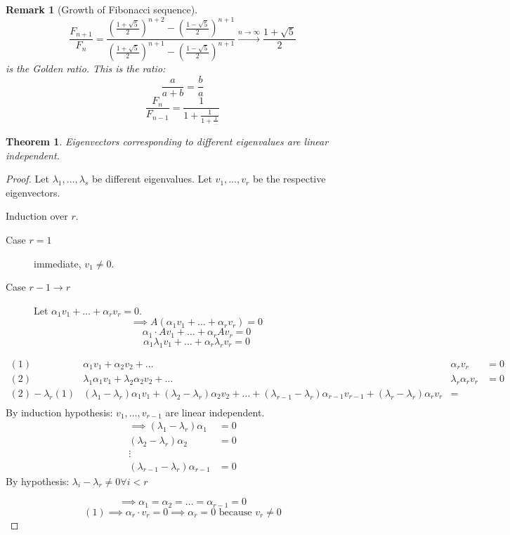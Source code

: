 \documentclass{article}
\newtheorem{theorem}{Theorem}  \numberwithin{theorem}{section}
\newtheorem{remark}{Remark}  \numberwithin{remark}{section}
\begin{document}
\begin{remark}[Growth of Fibonacci sequence]
  \[ \frac{F_{n+1}}{F_n} = \frac{\left(\frac{1 + \sqrt5}{2}\right)^{n+2} - \left(\frac{1 - \sqrt5}{2}\right)^{n+1}}{\left(\frac{1 + \sqrt5}{2}\right)^{n+1} - \left(\frac{1 - \sqrt5}{2}\right)^{n+1}} \xrightarrow{n\to\infty} \frac{1 + \sqrt5}{2} \]
  is the \emph{Golden ratio}. This is the ratio:
  \[ \frac{a}{a+b} = \frac ba \]
  \[ \frac{F_n}{F_{n-1}} = \frac{1}{1 + \frac{1}{1 + \frac{1}{\dots}}} \]
\end{remark}

\begin{theorem} %
  Eigenvectors corresponding to different eigenvalues are linear independent.
\end{theorem}

\begin{proof}
  Let $\lambda_1, \dots, \lambda_s$ be different eigenvalues. Let $v_1, \dots, v_r$ be the respective eigenvectors.

  Induction over $r$.
  \begin{description}
    \item[Case $r=1$]  immediate, $v_1 \neq 0$.
    \item[Case $r-1 \to r$]
      Let $\alpha_1 v_1 + \dots + \alpha_r v_r = 0$.
      \[ \implies A (\alpha_1 v_1 + \dots + \alpha_r v_r) = 0 \]
      \[ \alpha_1 \cdot A v_1 + \dots + \alpha_r A v_r = 0 \]
      \[ \alpha_1 \lambda_1 v_1 + \dots + \alpha_r \lambda_r v_r = 0 \]
  \end{description}

  \begin{align*}
    (1) & \alpha_1 v_1 + \alpha_2 v_2 + \dots & \alpha_r v_r &= 0 \\
    (2) & \lambda_1 \alpha_1 v_1 + \lambda_2 \alpha_2 v_2 + \dots & \lambda_r \alpha_r v_r &= 0 \\
    \hline
    (2) - \lambda_r (1) & (\lambda_1 - \lambda_r) \alpha_1 v_1 + (\lambda_2 - \lambda_r) \alpha_2 v_2 + \dots + (\lambda_{r-1} - \lambda_r) \alpha_{r-1} v_{r-1} + (\lambda_r - \lambda_r) \alpha_r v_r &= \\
  \end{align*}
  By induction hypothesis: $v_1, \dots, v_{r-1}$ are linear independent.
  \begin{align*}
    \implies (\lambda_1 - \lambda_r) \alpha_1 &= 0 \\
    (\lambda_2 - \lambda_r) \alpha_2 &= 0 \\
    \vdots & \\
    (\lambda_{r-1} - \lambda_r) \alpha_{r-1} &= 0
  \end{align*}
  By hypothesis: $\lambda_i - \lambda_r \neq 0 \forall i < r$

  \[ \implies \alpha_1 = \alpha_2 = \dots = \alpha_{r-1} = 0 \]
  \[ (1) \implies \alpha_r \cdot v_r = 0 \implies \alpha_r = 0 \text{ because } v_r \neq 0 \]
\end{proof}
\end{document}
